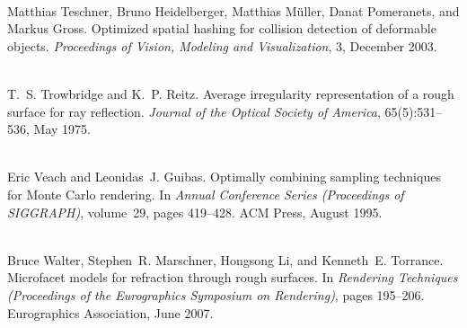 \begin{DoxyDescription}
\item[\label{citelist_CITEREF_Teschner:2003:Optimized}%
\Hypertarget{citelist_CITEREF_Teschner:2003:Optimized}%
\mbox{[}13\mbox{]}]\hfill \\
Matthias Teschner, Bruno Heidelberger, Matthias Müller, Danat Pomeranets, and Markus Gross. Optimized spatial hashing for collision detection of deformable objects. {\itshape Proceedings of Vision, Modeling and Visualization}, 3, December 2003.


\item[\label{citelist_CITEREF_Trowbridge:1975:Average}%
\Hypertarget{citelist_CITEREF_Trowbridge:1975:Average}%
\mbox{[}14\mbox{]}]\hfill \\
T.~S. Trowbridge and K.~P. Reitz. Average irregularity representation of a rough surface for ray reflection. {\itshape Journal of the Optical Society of America}, 65(5)\+:531--536, May 1975. 


\item[\label{citelist_CITEREF_Veach:1995:Optimally}%
\Hypertarget{citelist_CITEREF_Veach:1995:Optimally}%
\mbox{[}15\mbox{]}]\hfill \\
Eric Veach and Leonidas~J. Guibas. Optimally combining sampling techniques for Monte Carlo rendering. In {\itshape Annual Conference Series (Proceedings of SIGGRAPH)}, volume~29, pages 419--428. ACM Press, August 1995. 


\item[\label{citelist_CITEREF_Walter:2007:Microfacet}%
\Hypertarget{citelist_CITEREF_Walter:2007:Microfacet}%
\mbox{[}16\mbox{]}]\hfill \\
Bruce Walter, Stephen~R. Marschner, Hongsong Li, and Kenneth~E. Torrance. Microfacet models for refraction through rough surfaces. In {\itshape Rendering Techniques (Proceedings of the Eurographics Symposium on Rendering)}, pages 195--206. Eurographics Association, June 2007. 


\end{DoxyDescription}